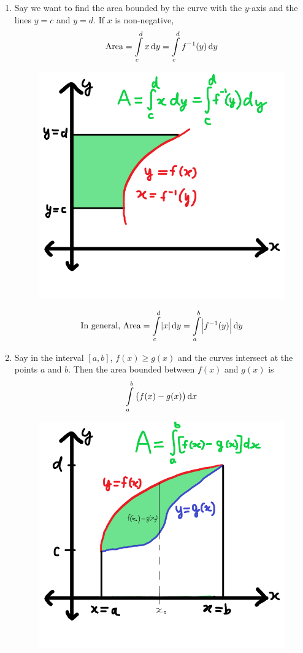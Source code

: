 \documentclass[14]{article}
\theoremstyle{definition}
\theoremstyle{case}
\begin{document}
\begin{enumerate}
\begin{figure}[h]
\end{figure}
\pagebreak
\item Say we want to find the area bounded by the curve with the $y$-axis and the lines $y=c$ and $y=d$. If $x$ is non-negative,
\[\text{Area} = \int\limits_c^d x \dif y = \int\limits_c^d f^{-1}(y) \dif y\]
\begin{figure}[h]\centering
\includegraphics[scale=.4]{images/int_areas_y_axis}
\end{figure}
\[\text{In general, Area} = \int\limits_c^d \abs{x} \dif y = \int\limits_a^b \abs{f^{-1}(y)} \dif y\]
\item Say in the interval $[a, b]$, $f(x) \geq g(x)$ and the curves intersect at the points $a$ and $b$. Then the area bounded between $f(x)$ and $g(x)$ is 
\[\int\limits_a^b \left( f(x) - g(x) \right) \dif x\]
\begin{figure}[h]\centering
\includegraphics[scale=.4]{images/int_areas_cycle}

\end{figure}
\end{enumerate}
\end{document}

